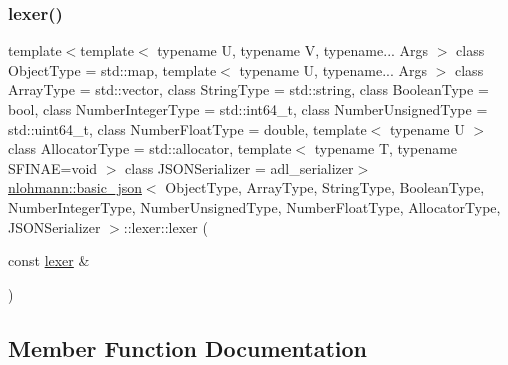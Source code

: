 \subsubsection{\texorpdfstring{lexer()}{lexer()}\hspace{0.1cm}{\footnotesize\ttfamily [4/4]}}
{\footnotesize\ttfamily template$<$template$<$ typename U, typename V, typename... Args $>$ class Object\+Type = std\+::map, template$<$ typename U, typename... Args $>$ class Array\+Type = std\+::vector, class String\+Type  = std\+::string, class Boolean\+Type  = bool, class Number\+Integer\+Type  = std\+::int64\+\_\+t, class Number\+Unsigned\+Type  = std\+::uint64\+\_\+t, class Number\+Float\+Type  = double, template$<$ typename U $>$ class Allocator\+Type = std\+::allocator, template$<$ typename T, typename S\+F\+I\+N\+A\+E=void $>$ class J\+S\+O\+N\+Serializer = adl\+\_\+serializer$>$ \\
\hyperlink{classnlohmann_1_1basic__json}{nlohmann\+::basic\+\_\+json}$<$ Object\+Type, Array\+Type, String\+Type, Boolean\+Type, Number\+Integer\+Type, Number\+Unsigned\+Type, Number\+Float\+Type, Allocator\+Type, J\+S\+O\+N\+Serializer $>$\+::lexer\+::lexer (\begin{DoxyParamCaption}\item[{const \hyperlink{classnlohmann_1_1basic__json_1_1lexer}{lexer} \&}]{ }\end{DoxyParamCaption})\hspace{0.3cm}{\ttfamily [delete]}}



\subsection{Member Function Documentation}
\mbox{\label{classnlohmann_1_1basic__json_1_1lexer_a0b137b9457f558c4b2352259b12ed5ff}} 
